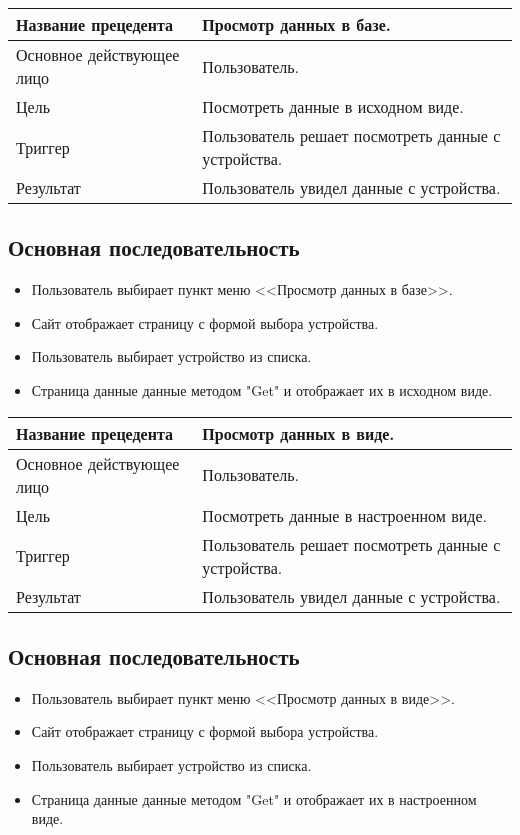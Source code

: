\begin{center}
    \begin{tabularx}{\textwidth}{|X|X|} \hline
    Название прецедента       & Просмотр данных в базе.\\ \hline
    Основное действующее лицо & Пользователь.\\ \hline
    Цель                      & Посмотреть данные в исходном виде.\\ \hline
    Триггер                   & Пользователь решает посмотреть данные с устройства.\\ \hline
    Результат                 & Пользователь увидел данные с устройства.\\ \hline
    \end{tabularx}
\end{center}

\subsection{Основная последовательность}
\begin{itemize}
    \item Пользователь выбирает пункт меню <<Просмотр данных в базе>>.
    \item Сайт отображает страницу с формой выбора устройства.
    \item Пользователь выбирает устройство из списка.
    \item Страница данные данные методом "Get" и отображает их в исходном виде. 
\end{itemize}

\begin{center}
    \begin{tabularx}{\textwidth}{|X|X|} \hline
    Название прецедента       & Просмотр данных в виде.\\ \hline
    Основное действующее лицо & Пользователь.\\ \hline
    Цель                      & Посмотреть данные в настроенном виде.\\ \hline
    Триггер                   & Пользователь решает посмотреть данные с устройства.\\ \hline
    Результат                 & Пользователь увидел данные с устройства.\\ \hline
    \end{tabularx}
\end{center}

\subsection{Основная последовательность}
\begin{itemize}
    \item Пользователь выбирает пункт меню <<Просмотр данных в виде>>.
    \item Сайт отображает страницу с формой выбора устройства.
    \item Пользователь выбирает устройство из списка.
    \item Страница данные данные методом "Get" и отображает их в настроенном виде. 
\end{itemize}

